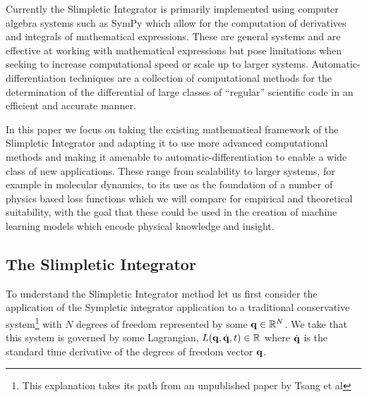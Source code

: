 \documentclass[10pt]{iopart}
\def\SI{Slimpletic Integrator}
\def\SymI{{Sympletic integrator}}
\def\autodiff{automatic-differentiation}
\begin{document}
Currently the \SI{} is primarily implemented using computer algebra systems such as SymPy\cite{sympy} which allow for the computation of derivatives and integrals of mathematical expressions. These are general systems and are effective at working with mathematical expressions but pose limitations when seeking to increase computational speed or scale up to larger systems. Automatic-differentiation  techniques are a collection of computational methods for the determination of the differential of large classes of \enquote{regular} scientific code in an efficient and accurate manner.

In this paper we focus on taking the existing mathematical framework of the \SI{} and adapting it to use more advanced computational methods and making it amenable to \autodiff{} to enable a wide class of new applications. These range from scalability to larger systems, for example in molecular dynamics, to its use as the foundation of a number of physics based loss functions which we will compare for empirical and theoretical suitability, with the goal that these could be used in the creation of machine learning models which encode physical knowledge and insight.


\subsection{The \SI}
\label{sec:intro-si}


To understand the \SI{} method let us first consider the application of the \SymI{} application to a traditional conservative system\footnote{This explanation takes its path from an unpublished paper by Tsang et al\cite{tsangVariationalSymplecticIntegrators}} with $N$ degrees of freedom represented by some $\vb{q} \in \mathbb{R}^N$. We take that this system is governed by some Lagrangian, $L(\vb{q}, \dot{\vb q}, t) \in \mathbb{R}$ where $\dot{\vb q}$ is the standard time derivative of the degrees of freedom vector $\vb q$.
\end{document}

